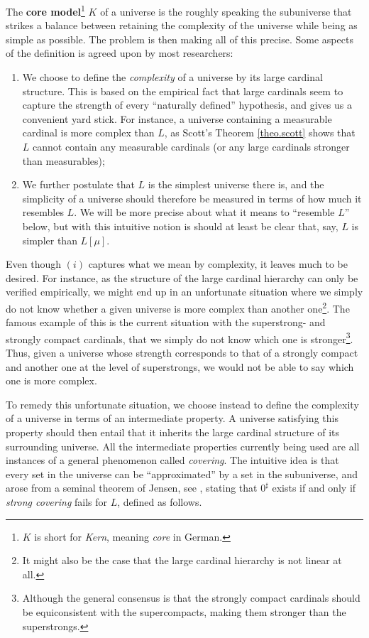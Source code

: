 \documentclass[../../main]{subfiles}
\begin{document}
The \textbf{core model}\footnote{$K$ is short for \textit{Kern}, meaning \textit{core} in German.} $K$ of a universe is the roughly speaking the subuniverse that strikes a balance between retaining the complexity of the universe while being as simple as possible. The problem is then making all of this precise. Some aspects of the definition is agreed upon by most researchers:
\begin{enumerate}
  \item We choose to define the \textit{complexity} of a universe by its large cardinal structure. This is based on the empirical fact that large cardinals seem to capture the strength of every ``naturally defined'' hypothesis, and gives us a convenient yard stick. For instance, a universe containing a measurable cardinal is more complex than $L$, as Scott's Theorem \ref{theo.scott} shows that $L$ cannot contain any measurable cardinals (or any large cardinals stronger than measurables);
  \item We further postulate that $L$ is the simplest universe there is, and the simplicity of a universe should therefore be measured in terms of how much it resembles $L$. We will be more precise about what it means to ``resemble $L$'' below, but with this intuitive notion is should at least be clear that, say, $L$ is simpler than $L[\mu]$.\\
\end{enumerate}

Even though $(i)$ captures what we mean by complexity, it leaves much to be desired. For instance, as the structure of the large cardinal hierarchy can only be verified empirically, we might end up in an unfortunate situation where we simply do not know whether a given universe is more complex than another one\footnote{It might also be the case that the large cardinal hierarchy is not linear at all.}. The famous example of this is the current situation with the superstrong- and strongly compact cardinals, that we simply do not know which one is stronger\footnote{Although the general consensus is that the strongly compact cardinals should be equiconsistent with the supercompacts, making them stronger than the superstrongs.}. Thus, given a universe whose strength corresponds to that of a strongly compact and another one at the level of superstrongs, we would not be able to say which one is more complex. 

\qquad To remedy this unfortunate situation, we choose instead to define the complexity of a universe in terms of an intermediate property. A universe satisfying this property should then entail that it inherits the large cardinal structure of its surrounding universe. All the intermediate properties currently being used are all instances of a general phenomenon called \textit{covering}. The intuitive idea is that every set in the universe can be ``approximated'' by a set in the subuniverse, and arose from a seminal theorem of Jensen, see \cite[Theorem 11.56]{SchindlerBook}, stating that $0^\sharp$ exists if and only if \textit{strong covering} fails for $L$, defined as follows.
\end{document}
